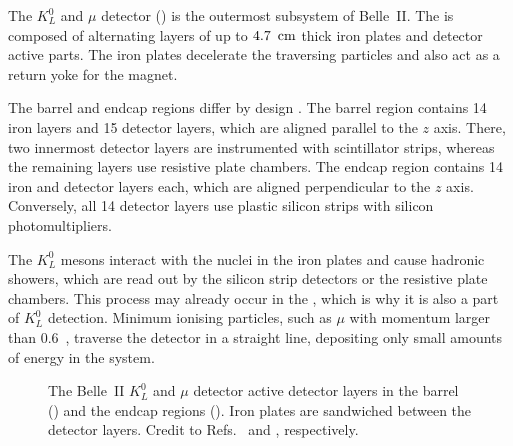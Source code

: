 The $K_L^0$ and $\mu$ detector (\KLM) \cite{Aushev:2014spa} is the outermost subsystem of Belle~II.
The \KLM is composed of alternating layers of up to $4.7~{\rm \,cm}$ thick iron plates and detector active parts.
The iron plates decelerate the traversing particles and also act as a return yoke for the magnet.

The barrel and endcap regions differ by design \cite{Krohn:317929}.
The barrel region contains 14 iron layers and 15 detector layers, which are aligned parallel to the $z$ axis.
There, two innermost detector layers are instrumented with scintillator strips, 
whereas the remaining layers use resistive plate chambers.
The endcap region contains 14 iron and detector layers each, which are aligned perpendicular to the $z$ axis.
Conversely, all 14 detector layers use plastic silicon strips with silicon photomultipliers.

The $K_L^0$ mesons interact with the nuclei in the iron plates and cause hadronic showers, 
which are read out by the silicon strip detectors or the resistive plate chambers.
This process may already occur in the \ECL, which is why it is also a part of $K_L^0$ detection.
Minimum ionising particles, such as $\mu$ with momentum larger than 0.6~\gevc, traverse the detector in a straight line, 
depositing only small amounts of energy in the system.

\begin{figure}[hbtp!]
    \caption{\label{fig:klm}
        The Belle~II $K_L^0$ and $\mu$ detector active detector layers in the barrel () and the endcap regions ().
        Iron plates are sandwiched between the detector layers.
        Credit to Refs.~\cite{Krohn:317929} and \cite{Aushev:2014spa}, respectively.
    }
\end{figure}

